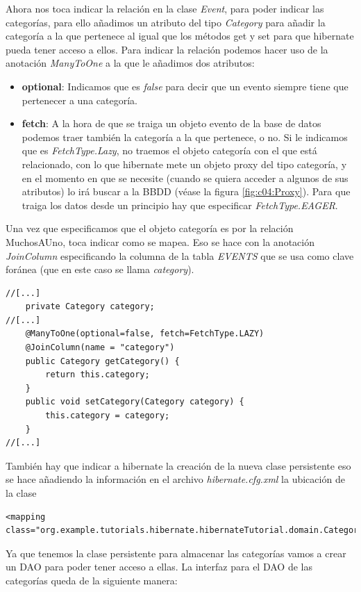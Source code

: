 \documentclass{article}
\begin{document}
	Ahora nos toca indicar la relación en la clase \emph{Event}, para poder indicar las categorías, para ello añadimos un atributo del tipo \emph{Category} para añadir la categoría a la que pertenece al igual que los métodos get y set para que hibernate pueda tener acceso a ellos. Para indicar la relación podemos hacer uso de la anotación \emph{ManyToOne} a la que le añadimos dos atributos:
{\setlength{\parskip}{0mm}
\begin{itemize}
	\item \textbf{optional}: Indicamos que es \emph{false} para decir que un evento siempre tiene que pertenecer a una categoría.
	\item \textbf{fetch}: A la hora de que se traiga un objeto evento de la base de datos podemos traer también la categoría a la que pertenece, o no. Si le indicamos que es \emph{FetchType.Lazy}, no traemos el objeto categoría con el que está relacionado, con lo que hibernate mete un objeto proxy del tipo categoría, y en el momento en que se necesite (cuando se quiera acceder a algunos de sus atributos) lo irá buscar a la BBDD (véase la figura \ref{fig:c04:Proxy}). Para que traiga los datos desde un principio hay que especificar \emph{FetchType.EAGER}.
\end{itemize}
}
Una vez que especificamos que el objeto categoría es por la relación MuchosAUno, toca indicar como se mapea. Eso se hace con la anotación \emph{JoinColumn} especificando la columna de la tabla \emph{EVENTS} que se usa como clave foránea (que en este caso se llama \emph{category}).
\begin{lstlisting}[style=java]
//[...]
	private Category category;
//[...]
	@ManyToOne(optional=false, fetch=FetchType.LAZY)
	@JoinColumn(name = "category")
	public Category getCategory() {
		return this.category;
	}
	public void setCategory(Category category) {
		this.category = category;
	}
//[...]
\end{lstlisting}

	También hay que indicar a hibernate la creación de la nueva clase persistente eso se hace añadiendo la información en el archivo \emph{hibernate.cfg.xml} la ubicación de la clase
\begin{lstlisting}[style=xml]
<mapping class="org.example.tutorials.hibernate.hibernateTutorial.domain.Category"/>
\end{lstlisting}

	Ya que tenemos la clase persistente para almacenar las categorías vamos a crear un DAO para poder tener acceso a ellas. La interfaz para el DAO de las categorías queda de la siguiente manera:

\end{document}
